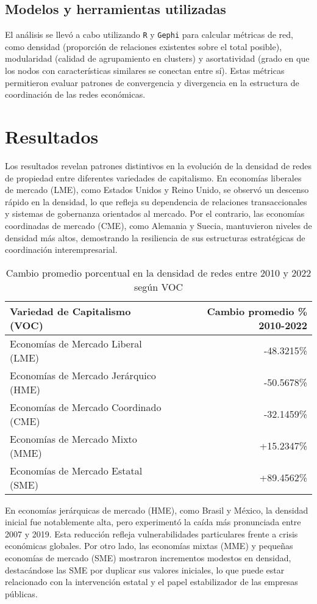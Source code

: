\documentclass[12pt]{article}
\begin{document}
\subsection{Modelos y herramientas utilizadas}
El análisis se llevó a cabo utilizando \texttt{R} y \texttt{Gephi} para calcular métricas de red, como densidad (proporción de relaciones existentes sobre el total posible), modularidad (calidad de agrupamiento en clusters) y asortatividad (grado en que los nodos con características similares se conectan entre sí). Estas métricas permitieron evaluar patrones de convergencia y divergencia en la estructura de coordinación de las redes económicas.
\blindtext

\section{Resultados}
Los resultados revelan patrones distintivos en la evolución de la densidad de redes de propiedad entre diferentes variedades de capitalismo. En economías liberales de mercado (LME), como Estados Unidos y Reino Unido, se observó un descenso rápido en la densidad, lo que refleja su dependencia de relaciones transaccionales y sistemas de gobernanza orientados al mercado. Por el contrario, las economías coordinadas de mercado (CME), como Alemania y Suecia, mantuvieron niveles de densidad más altos, demostrando la resiliencia de sus estructuras estratégicas de coordinación interempresarial.

\begin{table}[h!]
\centering
\begin{tabular}{l | r}
\hline
\hline
Variedad de Capitalismo (VOC) & Cambio promedio \% 2010-2022 \\
\hline
Economías de Mercado Liberal (LME)      & -48.3215\% \\
Economías de Mercado Jerárquico (HME)   & -50.5678\% \\
Economías de Mercado Coordinado (CME)  & -32.1459\% \\
Economías de Mercado Mixto (MME)        &  +15.2347\% \\
Economías de Mercado Estatal (SME)      &  +89.4562\% \\
\hline
\hline
\end{tabular}
\caption{Cambio promedio porcentual en la densidad de redes entre 2010 y 2022 según VOC}
\label{tab:Densities}
\end{table}

En economías jerárquicas de mercado (HME), como Brasil y México, la densidad inicial fue notablemente alta, pero experimentó la caída más pronunciada entre 2007 y 2019. Esta reducción refleja vulnerabilidades particulares frente a crisis económicas globales. Por otro lado, las economías mixtas (MME) y pequeñas economías de mercado (SME) mostraron incrementos modestos en densidad, destacándose las SME por duplicar sus valores iniciales, lo que puede estar relacionado con la intervención estatal y el papel estabilizador de las empresas públicas.
\end{document}
